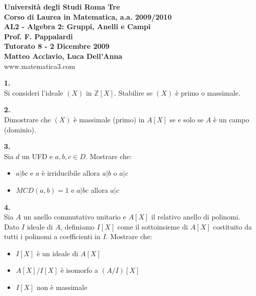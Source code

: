 \documentclass[italian,a4paper,11pt]
{article}
\newcommand{\Z}{\mathbb Z}
\newcommand{\acc}{\`}
\begin{document}
\begin{center}

\textbf{Universit\`a degli Studi Roma Tre}\\

\textbf{Corso di Laurea in Matematica, a.a. 2009/2010}\\

\textbf{AL2 - Algebra 2: Gruppi, Anelli e Campi}\\

\textbf{Prof. F. Pappalardi}\\

\textbf{Tutorato 8 - 2 Dicembre 2009}\\

\textbf{Matteo Acclavio, Luca Dell'Anna}\\

www.matematica3.com\\
\end{center}



\vspace{0.4cm}

\vspace{0.4 cm}
\noindent
\begin{Ex}\textbf{ 1.}\\
Si consideri l'ideale $(X)$ in $\Z[X]$. Stabilire se $(X)$ \acc e primo o massimale.

\end{Ex}

\vspace{0.4 cm}
\noindent
\begin{Ex}\textbf{ 2.}\\
Dimostrare che $(X)$ \acc e massimale (primo) in $A[X]$ se e solo se $A$ \acc e un campo (dominio).
\end{Ex}

\vspace{0.4 cm}
\noindent
\begin{Ex}\textbf{ 3.}\\
Sia $d$ un UFD e $a,b,c\in D$. Mostrare che:
\begin{itemize}
\item $a|bc$ e $a$ \acc e irriducibile allora $a|b$ o $a|c$
\item $MCD(a,b)=1$ e $a|bc$ allora $a|c$
\end{itemize}
\end{Ex}

\vspace{0.4 cm}
\noindent
\begin{Ex}\textbf{ 4.}\\
Sia $A$ un anello commutativo unitario e $A[X]$ il relativo anello di polinomi. Dato $I$ ideale di $A$, definiamo $I[X]$ come il sottoinsieme di $A[X]$ costituito da tutti i polinomi a coefficienti in $I$. Mostrare che:
\begin{itemize}
\item $I[X]$ \acc e un ideale di $A[X]$
\item $A[X]/I[X]$ \acc e isomorfo a $(A/I)[X]$
\item $I[X]$ non \acc e massimale
\end{itemize}
\end{Ex}
\end{document}
